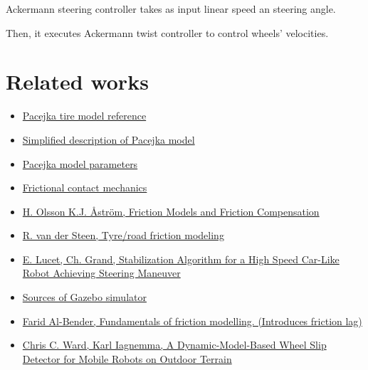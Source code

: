 \documentclass[a4paper,11pt]{article}
\begin{document}
Ackermann steering controller takes as input linear speed an steering angle. 

Then, it executes Ackermann twist controller to control wheels' velocities. 

\section{Related works}
\begin{itemize}

\item \href{http://andresmendes.github.io/Vehicle-Dynamics-Lateral/html/DocTirePacejka.html}{Pacejka tire model reference} 
\item \href{http://www-cdr.stanford.edu/dynamic/bywire/tires.pdf}{Simplified description of Pacejka model} 
\item \href{http://www.edy.es/dev/docs/pacejka-94-parameters-explained-a-comprehensive-guide/ }{Pacejka model parameters} 
\item \href{https://en.wikipedia.org/wiki/Frictional_contact_mechanics}{Frictional contact mechanics} 
\item \href{http://cats-fs.rpi.edu/~wenj/ECSE446S06/astrom_friction.pdf}{H. Olsson K.J. Åström, Friction Models and Friction Compensation} 
\item \href{http://www.mate.tue.nl/mate/pdfs/8147.pdf}{R. van der Steen, Tyre/road friction modeling} 
\item \href{http://www.isir.upmc.fr/files/icra08_lucet_et_al_optimized.pdf}{E. Lucet, Ch. Grand, Stabilization Algorithm for a High Speed Car-Like Robot Achieving Steering Maneuver} 
\item \href{https://bitbucket.org/osrf/gazebo/src}{Sources of Gazebo simulator} 
\item \href{http://aspe.net/publications/spring_2010/spr10ab/1010albender.pdf}{Farid Al-Bender, Fundamentals of friction modelling. (Introduces friction lag)} 
\item \href{http://web.mit.edu/mobility/publications/Iagnemma_TRO_07.pdf}{Chris C. Ward, Karl Iagnemma, A Dynamic-Model-Based Wheel Slip Detector
for Mobile Robots on Outdoor Terrain} 

\end{itemize}
\end{document}
